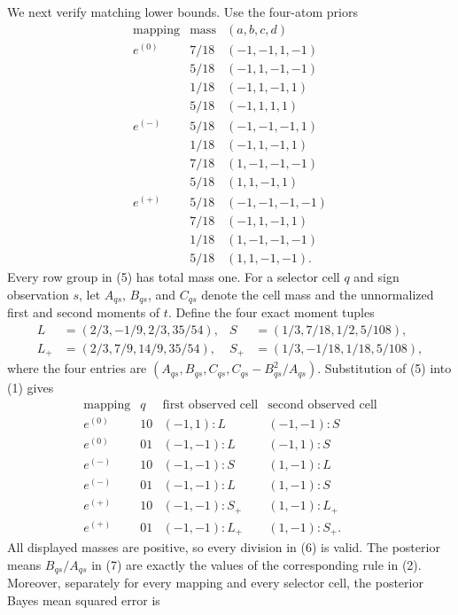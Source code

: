 We next verify matching lower bounds.  Use the four-atom priors
\[
\begin{array}{c|c|c}
\text{mapping}&\text{mass}&(a,b,c,d)\\ \hline
e^{(0)}&7/18&(-1,-1,1,-1)\\
       &5/18&(-1,1,-1,-1)\\
       &1/18&(-1,1,-1,1)\\
       &5/18&(-1,1,1,1)\\ \hline
e^{(-)}&5/18&(-1,-1,-1,1)\\
       &1/18&(-1,1,-1,1)\\
       &7/18&(1,-1,-1,-1)\\
       &5/18&(1,1,-1,1)\\ \hline
e^{(+)}&5/18&(-1,-1,-1,-1)\\
       &7/18&(-1,1,-1,1)\\
       &1/18&(1,-1,-1,-1)\\
       &5/18&(1,1,-1,-1).
\end{array} \tag{5}
\]
Every row group in (5) has total mass one.  For a selector cell \(q\) and sign observation \(s\), let \(A_{qs}\), \(B_{qs}\), and \(C_{qs}\) denote the cell mass and the unnormalized first and second moments of \(t\).  Define the four exact moment tuples
\[
 \begin{aligned}
 L&=(2/3,-1/9,2/3,35/54),
 &S&=(1/3,7/18,1/2,5/108),\\
 L_+&=(2/3,7/9,14/9,35/54),
 &S_+&=(1/3,-1/18,1/18,5/108),
 \end{aligned} \tag{6}
\]
where the four entries are \((A_{qs},B_{qs},C_{qs},C_{qs}-B_{qs}^2/A_{qs})\).  Substitution of (5) into (1) gives
\[
\begin{array}{c|c|cc}
\text{mapping}&q&\text{first observed cell}&\text{second observed cell}\\ \hline
e^{(0)}&10&(-1,1):L&(-1,-1):S\\
e^{(0)}&01&(-1,-1):L&(-1,1):S\\
e^{(-)}&10&(-1,-1):S&(1,-1):L\\
e^{(-)}&01&(-1,-1):L&(1,-1):S\\
e^{(+)}&10&(-1,-1):S_+&(1,-1):L_+\\
e^{(+)}&01&(-1,-1):L_+&(1,-1):S_+.
\end{array} \tag{7}
\]
All displayed masses are positive, so every division in (6) is valid.  The posterior means \(B_{qs}/A_{qs}\) in (7) are exactly the values of the corresponding rule in (2).  Moreover, separately for every mapping and every selector cell, the posterior Bayes mean squared error is
